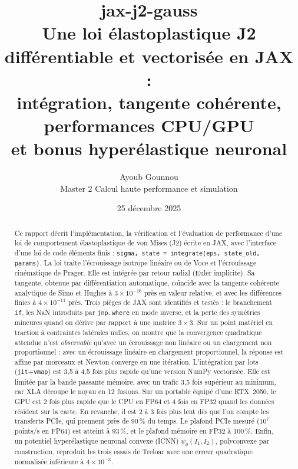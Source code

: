 \documentclass[11pt,a4paper]{article}
\title{\textbf{jax-j2-gauss}\\[4pt]
\large Une loi élastoplastique J2 différentiable et vectorisée en JAX :\\
intégration, tangente cohérente, performances CPU/GPU\\ et bonus hyperélastique neuronal}
\author{Ayoub Gounnou\\ \small Master 2 Calcul haute performance et simulation}
\date{25 décembre 2025}
\newcommand{\code}[1]{\texttt{#1}}
\theoremstyle{definition}
\begin{document}
\maketitle

\begin{abstract}
\noindent Ce rapport décrit l'implémentation, la vérification et l'évaluation de performance d'une loi de comportement élastoplastique de von Mises (J2) écrite en JAX, avec l'interface d'une loi de code éléments finis : \code{sigma, state = integrate(eps, state\_old, params)}. La loi traite l'écrouissage isotrope linéaire ou de Voce et l'écrouissage cinématique de Prager. Elle est intégrée par retour radial (Euler implicite). Sa tangente, obtenue par différentiation automatique, coïncide avec la tangente cohérente analytique de Simo et Hughes à $3\times10^{-16}$ près en valeur relative, et avec les différences finies à $4\times10^{-11}$ près. Trois pièges de JAX sont identifiés et testés : le branchement \code{if}, les NaN introduits par \code{jnp.where} en mode inverse, et la perte des symétries mineures quand on dérive par rapport à une matrice $3\times3$. Sur un point matériel en traction à contraintes latérales nulles, on montre que la convergence quadratique attendue n'est \emph{observable} qu'avec un écrouissage non linéaire ou un chargement non proportionnel : avec un écrouissage linéaire en chargement proportionnel, la réponse est affine par morceaux et Newton converge en une itération. L'intégration par lots (\code{jit}+\code{vmap}) est 3,5 à 4,5 fois plus rapide qu'une version NumPy vectorisée. Elle est limitée par la bande passante mémoire, avec un trafic 3,5 fois supérieur au minimum, car XLA découpe le noyau en 12 fusions. Sur un portable équipé d'une RTX~2050, le GPU est 2 fois plus rapide que le CPU en FP64 et 4 fois en FP32 quand les données résident sur la carte. En revanche, il est 2 à 3 fois plus lent dès que l'on compte les transferts PCIe, qui prennent près de 90\,\% du temps. Le plafond PCIe mesuré ($10^7$ points/s en FP64) est atteint à 93\,\%, et le plafond mémoire en FP32 à 100\,\%. Enfin, un potentiel hyperélastique neuronal convexe (ICNN) $\psi_\theta(I_1,I_2)$, polyconvexe par construction, reproduit les trois essais de Treloar avec une erreur quadratique normalisée inférieure à $4\times10^{-3}$.
\end{abstract}

\tableofcontents
\newpage













\appendix



\end{document}
